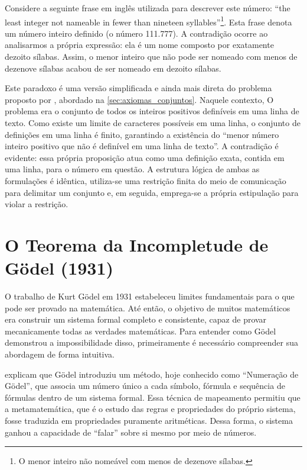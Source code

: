 Considere a seguinte frase em inglês utilizada para descrever este número: ``the least integer not nameable in fewer than nineteen syllables''\footnote{O menor inteiro não nomeável com menos de dezenove sílabas.}. Esta frase denota um número inteiro definido (o número 111.777). A contradição ocorre ao analisarmos a própria expressão: ela é um nome composto por exatamente dezoito sílabas. Assim, o menor inteiro que não pode ser nomeado com menos de dezenove sílabas acabou de ser nomeado em dezoito sílabas.

Este paradoxo é uma versão simplificada e ainda mais direta do problema proposto por \textcite{enderton1977}, abordado na \autoref{sec:axiomas_conjuntos}. Naquele contexto, O problema era o conjunto de todos os inteiros positivos definíveis em uma linha de texto. Como existe um limite de caracteres possíveis em uma linha, o conjunto de definições em uma linha é finito, garantindo a existência do ``menor número inteiro positivo que não é definível em uma linha de texto''. A contradição é evidente: essa própria proposição atua como uma definição exata, contida em uma linha, para o número em questão. A estrutura lógica de ambas as formulações é idêntica, utiliza-se uma restrição finita do meio de comunicação para delimitar um conjunto e, em seguida, emprega-se a própria estipulação para violar a restrição.

\section{O Teorema da Incompletude de Gödel (1931)}

O trabalho de Kurt Gödel em 1931 estabeleceu limites fundamentais para o que pode ser provado na matemática. Até então, o objetivo de muitos matemáticos era construir um sistema formal completo e consistente, capaz de provar mecanicamente todas as verdades matemáticas. Para entender como Gödel demonstrou a impossibilidade disso, primeiramente é necessário compreender sua abordagem de forma intuitiva.

\textcite[p.~68]{nagel2001} explicam que Gödel introduziu um método, hoje conhecido como ``Numeração de Gödel'', que associa um número único a cada símbolo, fórmula e sequência de fórmulas dentro de um sistema formal. Essa técnica de mapeamento permitiu que a metamatemática, que é o estudo das regras e propriedades do próprio sistema, fosse traduzida em propriedades puramente aritméticas. Dessa forma, o sistema ganhou a capacidade de ``falar'' sobre si mesmo por meio de números.

